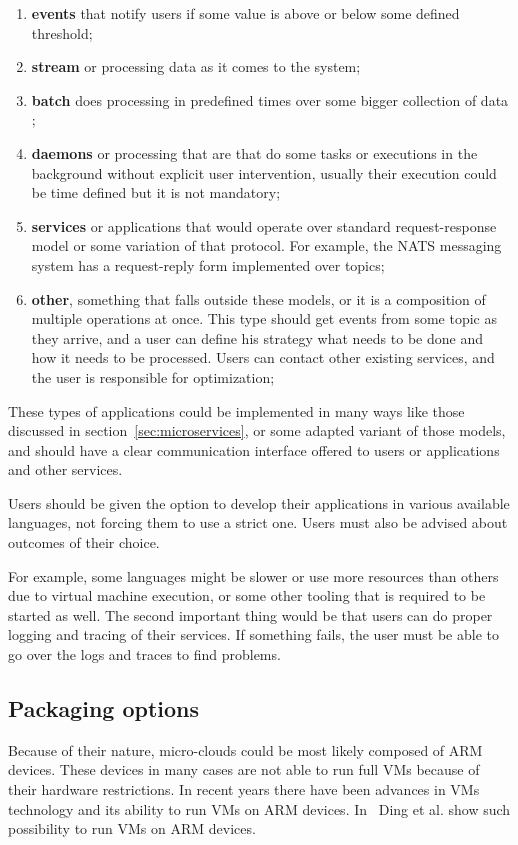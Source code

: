 \begin{enumerate}[start=1,label={(\bfseries \arabic*)}]
	\item \textbf{events} that notify users if some value is above or below some defined threshold; 
	\item \textbf{stream} or processing data as it comes to the system;
	\item \textbf{batch} does processing in predefined times over some bigger collection of data ;
	\item \textbf{daemons} or processing that are that do some tasks or executions in the background without explicit user intervention, usually their execution could be time defined but it is not mandatory;
	\item \textbf{services} or applications that would operate over standard request-response model or some variation of that protocol. For example, the NATS messaging system has a request-reply form implemented over topics;
	\item \textbf{other}, something that falls outside these models, or it is a composition of multiple operations at once. This type should get events from some topic as they arrive, and a user can define his strategy what needs to be done and how it needs to be processed. Users can contact other existing services, and the user is responsible for optimization;
\end{enumerate}

\noindent
These types of applications could be implemented in many ways like those discussed in section~\ref{sec:microservices}, or some adapted variant of those models, and should have a clear communication interface offered to users or applications and other services. 

Users should be given the option to develop their applications in various available languages, not forcing them to use a strict one. Users must also be advised about outcomes of their choice. 

For example, some languages might be slower or use more resources than others due to virtual machine execution, or some other tooling that is required to be started as well. The second important thing would be that users can do proper logging and tracing of their services. If something fails, the user must be able to go over the logs and traces to find problems.
%
\subsection{Packaging options}\label{sec:packaging}
%
Because of their nature, micro-clouds could be most likely composed of ARM devices. These devices in many cases are not able to run full VMs because of their hardware restrictions. In recent years there have been advances in VMs technology and its ability to run VMs on ARM devices. In~\cite{Ding12armvisor} Ding et al. show such possibility to run VMs on ARM devices.

